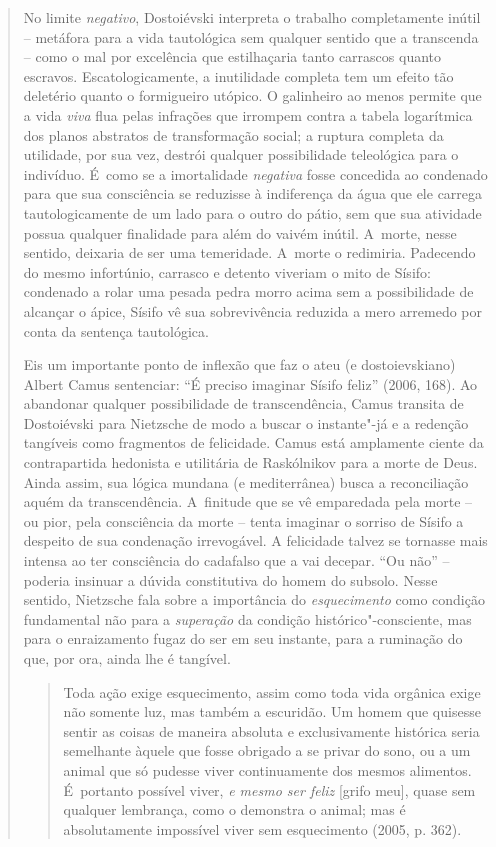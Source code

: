 {\begin{quote}
No limite \emph{negativo}, Dostoiévski interpreta o trabalho
completamente inútil -- metáfora para a vida tautológica sem qualquer
sentido que a transcenda -- como o mal por excelência que estilhaçaria
tanto carrascos quanto escravos. Escatologicamente, a inutilidade
completa tem um efeito tão deletério quanto o formigueiro utópico. O
galinheiro ao menos permite que a vida \emph{viva} flua pelas infrações
que irrompem contra a tabela logarítmica dos planos abstratos de
transformação social; a ruptura completa da utilidade, por sua vez,
destrói qualquer possibilidade teleológica para o indivíduo. É~como se a
imortalidade \emph{negativa} fosse concedida ao condenado para que sua
consciência se reduzisse à indiferença da água que ele carrega
tautologicamente de um lado para o outro do pátio, sem que sua atividade
possua qualquer finalidade para além do vaivém inútil. A~morte, nesse
sentido, deixaria de ser uma temeridade. A~morte o redimiria. Padecendo
do mesmo infortúnio, carrasco e detento viveriam o mito de Sísifo:
condenado a rolar uma pesada pedra morro acima sem a possibilidade de
alcançar o ápice, Sísifo vê sua sobrevivência reduzida a mero arremedo
por conta da sentença tautológica.

Eis um importante ponto de inflexão que faz o ateu (e dostoievskiano)
Albert Camus sentenciar: ``É preciso imaginar Sísifo feliz'' (2006,
168). Ao abandonar qualquer possibilidade de transcendência, Camus
transita de Dostoiévski para Nietzsche de modo a buscar o instante"-já e
a redenção tangíveis como fragmentos de felicidade. Camus está
amplamente ciente da contrapartida hedonista e utilitária de Raskólnikov
para a morte de Deus. Ainda assim, sua lógica mundana (e mediterrânea)
busca a reconciliação aquém da transcendência. A~finitude que se vê
emparedada pela morte -- ou pior, pela consciência da morte -- tenta
imaginar o sorriso de Sísifo a despeito de sua condenação irrevogável. A
felicidade talvez se tornasse mais intensa ao ter consciência do
cadafalso que a vai decepar. ``Ou não'' -- poderia insinuar a dúvida
constitutiva do homem do subsolo. Nesse sentido, Nietzsche fala sobre a
importância do \emph{esquecimento} como condição fundamental não para a
\emph{superação} da condição histórico"-consciente, mas para o
enraizamento fugaz do ser em seu instante, para a ruminação do que, por
ora, ainda lhe é tangível.

\begin{quote}
Toda ação exige esquecimento, assim como toda vida orgânica exige não
somente luz, mas também a escuridão. Um homem que quisesse sentir as
coisas de maneira absoluta e exclusivamente histórica seria semelhante
àquele que fosse obrigado a se privar do sono, ou a um animal que só
pudesse viver continuamente dos mesmos alimentos. É~portanto possível
viver, \emph{e mesmo ser feliz} {[}grifo meu{]}, quase sem qualquer
lembrança, como o demonstra o animal; mas é absolutamente impossível
viver sem esquecimento (2005, p. 362).
\end{quote}


\end{quote}}
